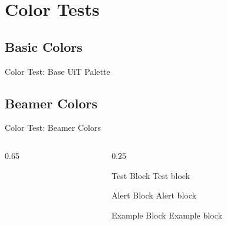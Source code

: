 \section{Color Tests}

\subsection{Basic Colors}

\begin{frame}{Color Test: Base UiT Palette}
    \scriptsize
    \uitcolortest

    \medskip

\end{frame}

\subsection{Beamer Colors}
\label{beamercolortest}

\begin{frame}{Color Test: Beamer Colors}
    \begin{columns}
        \begin{column}{0.65\textwidth}
            \scriptsize
            \uitcolortestbeamerpalette
            \smallskip
        \end{column}
        \begin{column}{0.25\textwidth}
            \begin{block}{Test Block}
                Test block
            \end{block}
            \begin{alertblock}{Alert Block}
                Alert block
            \end{alertblock}
            \begin{exampleblock}{Example Block}
                Example block
            \end{exampleblock}
        \end{column}
    \end{columns}
\end{frame}

